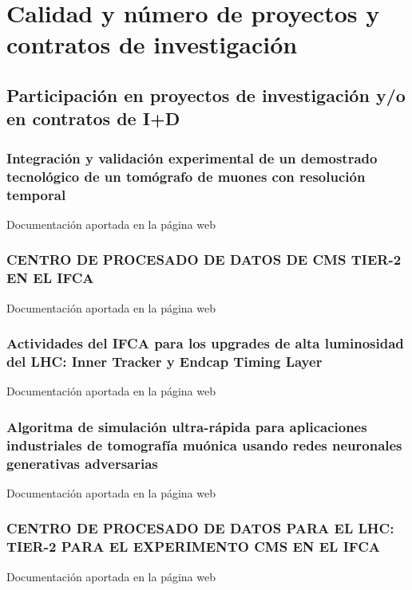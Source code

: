 \documentclass[a4paper, 11pt, twoside, openright]{report}
\begin{document}
\section{Calidad y número de proyectos y contratos de investigación}

\subsection{Participación en proyectos de investigación y/o en contratos de I+D}

\subsubsection{Integración y validación experimental de un demostrado tecnológico de un tomógrafo de muones con resolución temporal}
Documentación aportada en la página web
%

\subsubsection{CENTRO DE PROCESADO DE DATOS DE CMS TIER-2 EN EL IFCA}
Documentación aportada en la página web
%

\subsubsection{Actividades del IFCA para los upgrades de alta luminosidad del LHC: Inner Tracker y Endcap Timing Layer}
Documentación aportada en la página web
%

\subsubsection{Algoritma de simulación ultra-rápida para aplicaciones industriales de tomografía muónica usando redes neuronales generativas adversarias}
Documentación aportada en la página web
%

\subsubsection{CENTRO DE PROCESADO DE DATOS PARA EL LHC: TIER-2 PARA EL EXPERIMENTO CMS EN EL IFCA}
Documentación aportada en la página web
%
\end{document}
